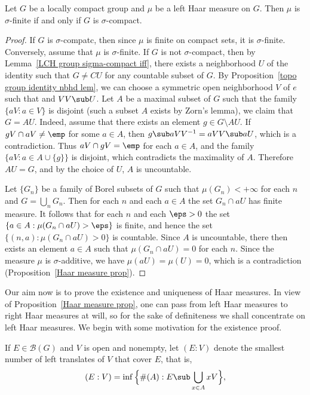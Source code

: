\begin{proposition}\label{Haar measure sigma-finite iff sigma-compact}
Let $G$ be a locally compact group and $\mu$ be a left Haar measure on $G$. Then $\mu$ is $\sigma$-finite if and only if $G$ is $\sigma$-compact.
\end{proposition}
\begin{proof}
If $G$ is $\sigma$-compatc, then since $\mu$ is finite on compact sets, it is $\sigma$-finite. Conversely, assume that $\mu$ is $\sigma$-finite. If $G$ is not $\sigma$-compact, then by Lemma~\ref{LCH group sigma-compact iff}, there exists a neighborhood $U$ of the identity such that $G\neq CU$ for any countable subset of $G$. By Proposition~\ref{topo group identity nbhd lem}, we can choose a symmetric open neighborhood $V$ of $e$ such that and $VV\sub U$. Let $A$ be a maximal subset of $G$ such that the family $\{aV:a\in V\}$ is disjoint (such a subset $A$ exists by Zorn's lemma), we claim that $G=AU$. Indeed, assume that there exists an element $g\in G\setminus AU$. If $gV\cap aV\neq\emp$ for some $a\in A$, then $g\sub aVV^{-1}=aVV\sub aU$, which is a contradiction. Thus $aV\cap gV=\emp$ for each $a\in A$, and the family $\{aV:a\in A\cup\{g\}\}$ is disjoint, which contradicts the maximality of $A$. Therefore $AU=G$, and by the choice of $U$, $A$ is uncountable.\par
Let $\{G_n\}$ be a family of Borel subsets of $G$ such that $\mu(G_n)<+\infty$ for each $n$ and $G=\bigcup_nG_n$. Then for each $n$ and each $a\in A$ the set $G_n\cap aU$ has finite measure. It follows that for each $n$ and each $\eps>0$ the set $\{a\in A:\mu(G_n\cap aU)>\eps\}$ is finite, and hence the set $\{(n,a):\mu(G_n\cap aU)>0\}$ is countable. Since $A$ is uncountable, there then exists an element $a\in A$ such that $\mu(G_n\cap aU)=0$ for each $n$. Since the measure $\mu$ is $\sigma$-additive, we have $\mu(aU)=\mu(U)=0$, which is a contradiction (Proposition~\ref{Haar measure prop}).
\end{proof}
Our aim now is to prove the existence and uniqueness of Haar measures. In view of Proposition~\ref{Haar measure prop}, one can pass from left Haar measures to right Haar measures at will, so for the sake of definiteness we shall concentrate on left Haar measures. We begin with some motivation for the existence proof.\par
If $E\in\mathcal{B}(G)$ and $V$ is open and nonempty, let $(E:V)$ denote the smallest number of left translates of $V$ that cover $E$, that is,
\[(E:V)=\inf\Big\{\#(A):E\sub\bigcup_{x\in A}xV\Big\},\]
